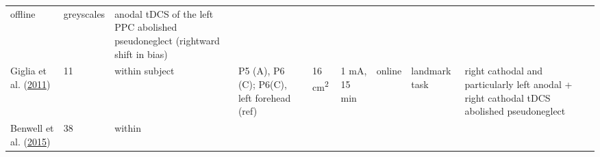 \documentclass[11pt,]{memoir}
\begin{document}
\begin{longtable}[]{@{}lllllllll@{}}
\begin{minipage}[t]{0.04\columnwidth}
offline\strut
\end{minipage} & \begin{minipage}[t]{0.15\columnwidth}\raggedright
greyscales\strut
\end{minipage} & \begin{minipage}[t]{0.24\columnwidth}\raggedright
anodal tDCS of the left PPC abolished pseudoneglect
(rightward shift in bias)\strut
\end{minipage}\tabularnewline
\begin{minipage}[t]{0.09\columnwidth}\raggedright
Giglia et al. (\protect\hyperlink{ref-Giglia2011}{2011})\strut
\end{minipage} & \begin{minipage}[t]{0.02\columnwidth}\raggedright
11\strut
\end{minipage} & \begin{minipage}[t]{0.04\columnwidth}\raggedright
within
subject\strut
\end{minipage} & \begin{minipage}[t]{0.10\columnwidth}\raggedright
P5 (A), P6 (C); P6(C),
left forehead (ref)\strut
\end{minipage} & \begin{minipage}[t]{0.03\columnwidth}\raggedright
16
cm\textsuperscript{2}\strut
\end{minipage} & \begin{minipage}[t]{0.05\columnwidth}\raggedright
1 mA, 15
min\strut
\end{minipage} & \begin{minipage}[t]{0.04\columnwidth}\raggedright
online\strut
\end{minipage} & \begin{minipage}[t]{0.15\columnwidth}\raggedright
landmark task\strut
\end{minipage} & \begin{minipage}[t]{0.24\columnwidth}\raggedright
right cathodal and particularly left anodal + right cathodal
tDCS abolished pseudoneglect\strut
\end{minipage}\tabularnewline
\begin{minipage}[t]{0.09\columnwidth}\raggedright
Benwell et al. (\protect\hyperlink{ref-Benwell2015}{2015})\strut
\end{minipage} & \begin{minipage}[t]{0.02\columnwidth}\raggedright
38\strut
\end{minipage} & \begin{minipage}[t]{0.04\columnwidth}\raggedright
within

\end{minipage}
\end{longtable}
\end{document}
